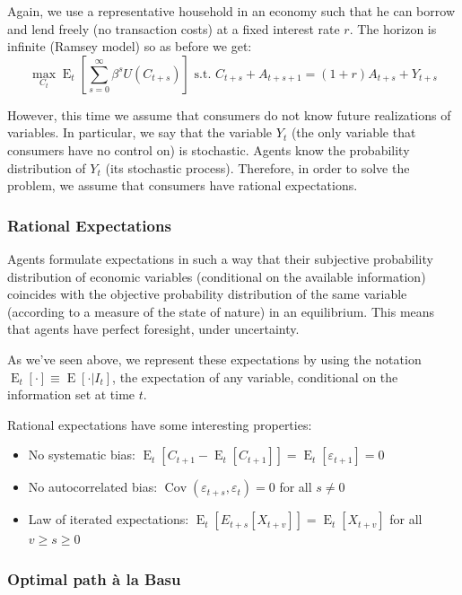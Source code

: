 \documentclass[12pt]{report}
\newcommand{\E}[1]{\operatorname{E}\left[#1\right]}
\newcommand{\Et}[1]{\operatorname{E}_t\left[#1\right]}
\newcommand{\cov}[1]{\operatorname{Cov}\left(#1\right)}
\begin{document}
Again, we use a representative household in an economy such that he can borrow and lend freely (no transaction costs) at a fixed interest rate $r$. The horizon is infinite (Ramsey model) so as before we get:$$\max_{C_t} \Et{\sum_{s=0}^{\infty}\beta^s U(C_{t+s})} \text{ s.t. } C_{t+s} + A_{t+s+1} = (1+r)A_{t+s} + Y_{t+s} $$

However, this time we assume that consumers do not know future realizations of variables. In particular, we say that the variable $Y_t$ (the only variable that consumers have no control on) is stochastic. Agents know the probability distribution of $Y_t$ (its stochastic process). Therefore, in order to solve the problem, we assume that consumers have rational expectations.

\subsubsection{Rational Expectations}

Agents formulate expectations in such a way that their subjective probability distribution of economic variables (conditional on the available information) coincides with the objective probability distribution of the same variable (according to a measure of the state of nature) in an equilibrium. This means that agents have perfect foresight, under uncertainty.

As we've seen above, we represent these expectations by using the notation $\Et{\cdot}\equiv \E{\cdot\vert I_t}$, the  expectation of any variable, conditional on the information set at time $t$.

Rational expectations have some interesting properties:\begin{itemize}
\item No systematic bias: $\Et{C_{t+1} - \Et{C_{t+1}}} = \Et{\varepsilon_{t+1}} = 0$
\item No autocorrelated bias: $\cov{\varepsilon_{t+s},\varepsilon_{t}} = 0$ for all $s\neq 0 $ 
\item Law of iterated expectations: $\Et{E_{t+s}\left[X_{t+v}\right]} = \Et{X_{t+v}}$ for all $v\geq s\geq 0$ 
\end{itemize}

\subsubsection{Optimal path à la Basu}
\end{document}
